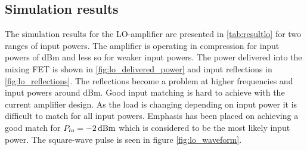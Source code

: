 		
			

		\subsection{Simulation results}
		
			The simulation results for the LO-amplifier are presented in \autoref{tab:resultlo} for two ranges of input powers. The amplifier is operating in compression for input powers of \unit[-2--0]{dBm} and less so for weaker input powers. The power delivered into the mixing FET is shown in \autoref{fig:lo_delivered_power} and input reflections in \autoref{fig:lo_reflections}. The reflections become a problem at higher frequencies and input powers around \unit[-4]{dBm}. Good input matching is hard to achieve with the current amplifier design. As the load is changing depending on input power it is difficult to match for all input powers. Emphasis has been placed on achieving a good match for $P_{lo}=\unit[-2]{dBm}$ which is considered to be the most likely input power. The square-wave pulse is seen in figure \autoref{fig:lo_waveform}. 





